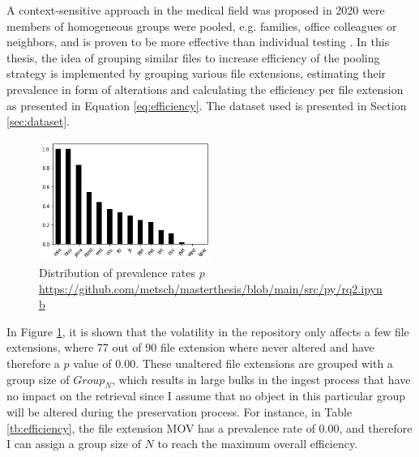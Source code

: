 A context-sensitive approach in the medical field was proposed in 2020 were members of homogeneous groups were pooled, e.g. families, office colleagues or neighbors, and is proven to be more effective than individual testing \cite[4]{deckert2020simulation}. In this thesis, the idea of grouping similar files to increase efficiency of the pooling strategy is implemented by grouping various file extensions, estimating their prevalence in form of alterations and calculating the efficiency per file extension as presented in Equation \ref{eq:efficiency}. The dataset used is presented in Section \ref{sec:dataset}.
\begin{figure}[H]%
    \centering
    \caption{Distribution of prevalence rates $p$ \url{https://github.com/metsch/masterthesis/blob/main/src/py/rq2.ipynb}}\label{fig:p-distribution}
    \includegraphics[width=0.5\textwidth]{graphics/p-distribution.png}
\end{figure}
In Figure \ref{fig:p-distribution}, it is shown that the volatility in the repository only affects a few file extensions, where 77 out of 90 file extension where never altered and have therefore a $p$ value of 0.00. These unaltered file extensions are grouped with a group size of $Group_N$, which results in large bulks in the ingest process that have no impact on the retrieval since I assume that no object in this particular group will be altered during the preservation process. For instance, in Table \ref{tb:efficiency}, the file extension MOV has a prevalence rate of 0.00, and therefore I can assign a group size of $N$ to reach the maximum overall efficiency.
